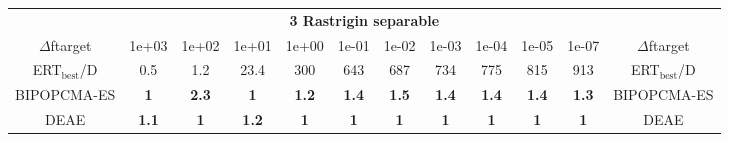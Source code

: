 \begin{tabular}{cccccccccccc}
 & \multicolumn{10}{c}{{\normalsize \textbf{3 Rastrigin separable}}}\\
$\Delta$ftarget& 1e+03& 1e+02& 1e+01& 1e+00& 1e-01& 1e-02& 1e-03& 1e-04& 1e-05& 1e-07 & $\Delta$ftarget \\
ERT$_{\textrm{best}}$/D& 0.5& 1.2& 23.4& 300& 643& 687& 734& 775& 815& 913 & ERT$_{\textrm{best}}$/D \\
\hline
BIPOPCMA-ES & \textbf{1} & \textbf{2.3} & \textbf{1} & \textbf{1.2} & \textbf{1.4} & \textbf{1.5} & \textbf{1.4} & \textbf{1.4} & \textbf{1.4} & \textbf{1.3} & BIPOPCMA-ES \cite{add_an_entry_for_BIPOPCMA-ES_in_bbob.bib}\\
DEAE & \textbf{1.1} & \textbf{1} & \textbf{1.2} & \textbf{1} & \textbf{1} & \textbf{1} & \textbf{1} & \textbf{1} & \textbf{1} & \textbf{1} & DEAE \cite{add_an_entry_for_DEAE_in_bbob.bib}
\end{tabular}
